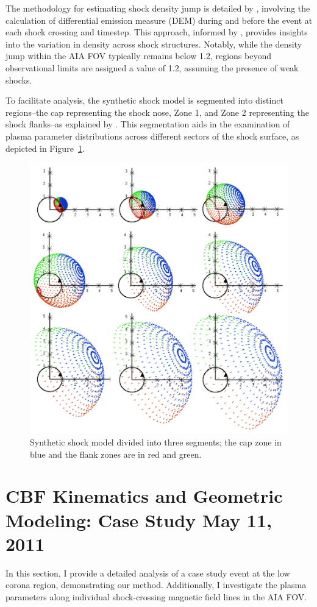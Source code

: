 The methodology for estimating shock density jump is detailed by \citet{kozarev_2017}, involving the calculation of differential emission measure (DEM) during and before the event at each shock crossing and timestep. This approach, informed by \citet{cheung_2015}, provides insights into the variation in density across shock structures. Notably, while the density jump within the AIA FOV typically remains below 1.2, regions beyond observational limits are assigned a value of 1.2, assuming the presence of weak shocks.

To facilitate analysis, the synthetic shock model is segmented into distinct regions--the cap representing the shock nose, Zone 1, and Zone 2 representing the shock flanks--as explained by \citet{kozarev_2022}. This segmentation aids in the examination of plasma parameter distributions across different sectors of the shock surface, as depicted in Figure~\ref{fig_segments}.

\begin{figure}[!htp] %
	\centerline{\includegraphics[width=0.5\columnwidth]{chapter2/figs/fig_s2m_segments_geometry.png}}
	\caption{Synthetic shock model divided into three segments; the cap zone in blue and the flank zones are in red and green.}
	\label{fig_segments}
\end{figure}

\section{CBF Kinematics and Geometric Modeling: Case Study May 11, 2011}




In this section, I provide a detailed analysis of a case study event at the low corona region, demonstrating our method. Additionally, I investigate the plasma parameters along individual shock-crossing magnetic field lines in the AIA FOV.

